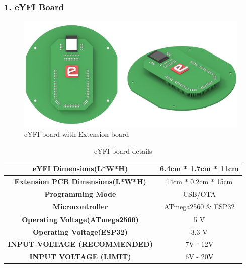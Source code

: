 \documentclass[12pt,a4paper,oneside]{book}
\begin{document}
			\subsubsection*{1. eYFI Board}
				\begin{figure}[H]
					\centering					
					\includegraphics[scale=1]{EYFI FULL}
					\caption{eYFI board with Extension board}	 
				\end{figure}
				\begin{table}[H]
					\centering
					\def\arraystretch{1.2}
					\caption{eYFI board details}
					\vspace{0.5cm}
					\begin{tabular}{|c||c|}
					\hline
						\textbf{eYFI Dimensions(L*W*H)} & 6.4cm * 1.7cm * 11cm\\\hline
						\textbf{Extension PCB Dimensions(L*W*H)} & 14cm * 0.2cm * 15cm\\\hline
						\textbf{Programming Mode} & USB/OTA\\\hline
						\textbf{Microcontroller} & ATmega2560 \& ESP32\\\hline
						\textbf{Operating Voltage(ATmega2560)} & 5 V\\\hline 
						\textbf{Operating Voltage(ESP32)} & 3.3 V\\\hline 
						\textbf{INPUT VOLTAGE (RECOMMENDED)} & 7V - 12V\\\hline
						\textbf{INPUT VOLTAGE (LIMIT)} & 6V - 20V\\\hline
					\end{tabular}
				\end{table}
				\pagebreak
				
\end{document}
